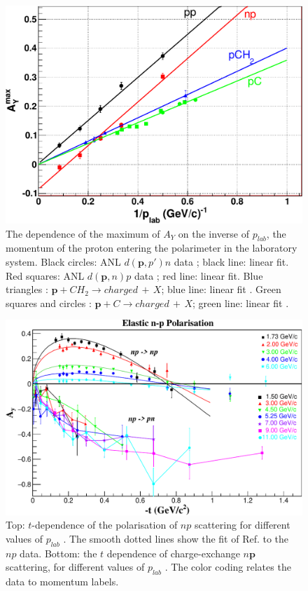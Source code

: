\documentclass[twocolumn,epjc3]{svjour3}
\renewcommand{\vec}[1]{\boldsymbol{#1}} %
\begin{document}
\begin{figure}
  \centering
  \includegraphics[width=1.00\columnwidth]{fig03_A_Y_Comb1a.pdf}
  \caption{The dependence of the maximum of $A_{Y}$ on the inverse of $p_{lab}$, the momentum of the proton entering the polarimeter in the laboratory system.  Black circles: ANL $d(\vec{p},p')n$ data \cite{PhysRevLett.35.632,Kramer:1977pf}; black line: linear fit. Red squares: ANL $d(\vec{p},n)p$ data \cite{Cheung:1995ei,Alekseev:1999ag} ; red line: linear fit. Blue triangles \cite{Azhgirey:2004yk}: $\vec{p}+ CH_{2} \to charged\,+\,X$; blue line: linear fit \cite{Azhgirey:2004yk}. Green squares \cite{Cheung:1995ei} and circles \cite{Alekseev:1999ag}: $\vec{p}+ C\to charged\,+\,X$; green line: linear fit \cite{Azhgirey:2004yk}.}
  \label{fig:Dep-Ay1}
\end{figure}

\begin{figure}
  \centering
  \includegraphics[width=1.00\columnwidth]{fig04_npPol3.pdf}
  \caption{Top: $t$-dependence of the polarisation of $np$ scattering for different values of $p_{lab}$ \cite{PhysRevLett.35.632,Kramer:1977pf}. The smooth dotted lines show the fit of Ref. \cite{Ladygin:409018} to the $np$ data.  Bottom: the $t$ dependence of charge-exchange $n \vec p$ scattering, for different values of $p_{lab}$ \cite{PhysRevLett.30.1183,Robrish:1970jw}. The color coding relates the data to momentum labels.}
  \label{fig:Dep-Ay}
\end{figure}
\end{document}
